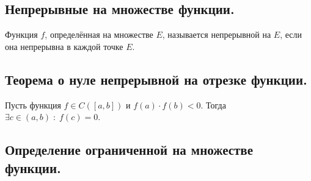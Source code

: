 
\label{sec_Definition01}
\begin{definition}
    \subsection*{Непрерывные на множестве функции.}
    \begin{note}[purple]
        Функция $f$, определённая на множестве $E$, называется непрерывной на $E$,
        если она непрерывна в каждой точке $E$. 
    \end{note}
    \subsection*{Теорема о нуле непрерывной на отрезке функции.}
    \begin{note}[purple]
        Пусть функция $f \in C([a, b])$ и $f(a) \cdot f(b) < 0$. Тогда 
        $\exists c \in (a, b) \; : \; f(c) = 0$. 
    \end{note}
    \subsection*{Определение ограниченной на множестве функции.}
    \begin{note}[purple]
        
    \end{note}
\end{definition}